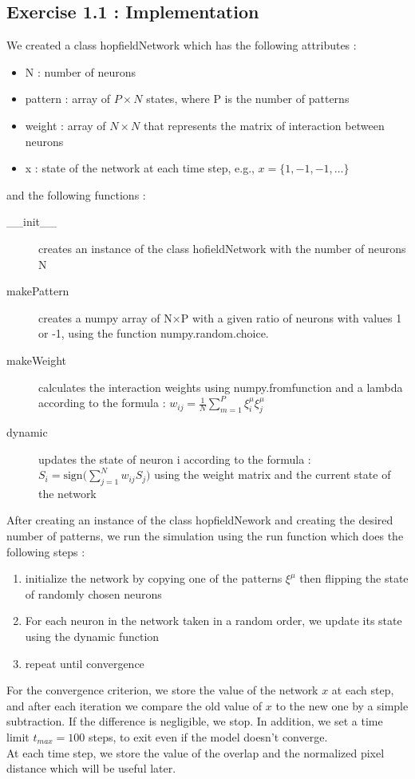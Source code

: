 \subsection{Exercise 1.1 : Implementation}
We created a class hopfieldNetwork which has the following attributes : 
\begin{itemize}
\item N : number of neurons 
\item pattern : array of $P\times N$ states, where P is the number of patterns 
\item weight : array of $N\times N$ that represents the matrix of interaction between neurons
\item x : state of the network at each time step, e.g.,  $x = \{1, -1, -1, \dots\}$
\end{itemize}
and the following functions : 
\begin{description}
\item [\_\_init\_\_] creates an instance of the class hofieldNetwork with the number of neurons N 
\item [makePattern] creates a numpy array of N$\times$P with a given ratio of neurons with values 1 or -1, using the function numpy.random.choice. 
\item [makeWeight] calculates the interaction weights using numpy.fromfunction and a lambda according to the formula : $w_{ij} = \frac{1}{N}\sum_{m=1}^P \xi_i^{\mu} \xi_j^{\mu}$
\item[dynamic] updates the state of neuron i according to the formula : $S_i = \textrm{sign}\big(\sum_{j=1}^N w_{ij}S_j\big)$ using the weight matrix and the current state of the network

\end{description}

After creating an instance of the class hopfieldNework and creating the desired number of patterns, we run the simulation using the run function which does the following steps : 
\begin{enumerate}
\item initialize the network by copying one of the patterns $\xi^{\mu}$ then flipping the state of randomly chosen neurons 
\item For each neuron in the network taken in a random order, we update its state using the dynamic function
\item repeat until convergence
\end{enumerate}
For the convergence criterion, we store the value of the network $x$ at each step, and after each iteration we compare 
the old value of $x$ to the new one by a simple subtraction. If the difference is negligible, we stop. In addition, we set a time limit $t_{max} = 100$ 
steps, to exit even if the model doesn't converge. \\
At each time step, we store the value of the overlap and the normalized pixel distance which will be useful later. \\
 
